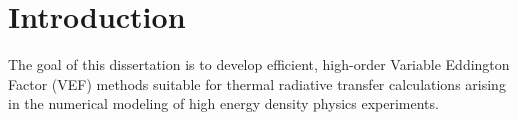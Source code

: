 \documentclass[../doc.tex]{subfiles}
\begin{document}
\chapter{Introduction}
The goal of this dissertation is to develop efficient, high-order Variable Eddington Factor (VEF) methods suitable for thermal radiative transfer calculations arising in the numerical modeling of high energy density physics experiments. 
\end{document}
